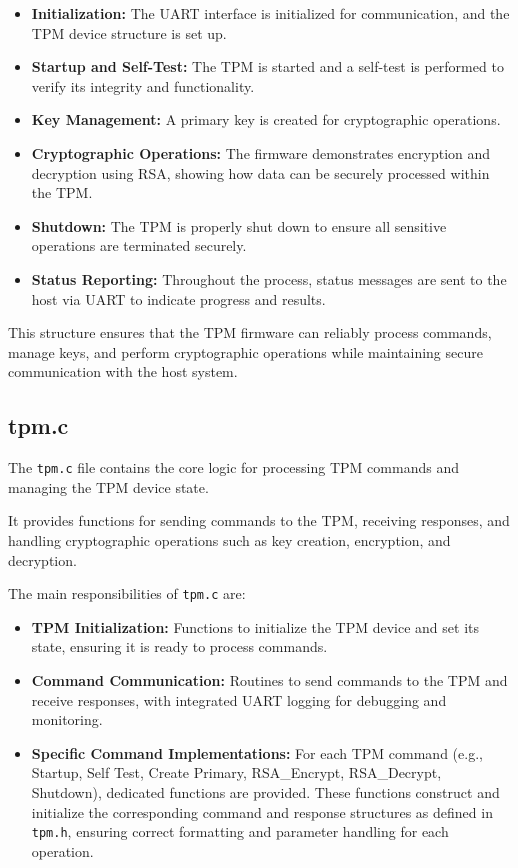 \begin{itemize}
    \item \textbf{Initialization:} The UART interface is 
    initialized for communication, and the TPM device 
    structure is set up.
    \item \textbf{Startup and Self-Test:} The TPM is 
    started and a self-test is performed to verify its 
    integrity and functionality.
    \item \textbf{Key Management:} A primary key is 
    created for cryptographic operations.
    \item \textbf{Cryptographic Operations:} The firmware 
    demonstrates encryption and decryption using RSA, 
    showing how data can be securely processed within 
    the TPM.
    \item \textbf{Shutdown:} The TPM is properly shut 
    down to ensure all sensitive operations are 
    terminated securely.
    \item \textbf{Status Reporting:} Throughout the 
    process, status messages are sent to the host 
    via UART to indicate progress and results.
\end{itemize}

This structure ensures that the TPM firmware can reliably 
process commands, manage keys, and perform cryptographic 
operations while maintaining secure communication with 
the host system.


\subsection{tpm.c}

The \texttt{tpm.c} file contains the core logic for 
processing TPM commands and managing the TPM device state.

It provides functions for sending commands to the TPM, 
receiving responses, and handling cryptographic operations 
such as key creation, encryption, and decryption. 

The main responsibilities of \texttt{tpm.c} are:

\begin{itemize}
    \item \textbf{TPM Initialization:} Functions to 
    initialize the TPM device and set its state,
    ensuring it is ready to process commands.
    \item \textbf{Command Communication:} Routines to 
    send commands to the TPM and receive responses, 
    with integrated UART logging for debugging and 
    monitoring.
    \item \textbf{Specific Command Implementations:} For 
    each TPM command (e.g., Startup, Self Test, Create 
    Primary, RSA\_Encrypt, RSA\_Decrypt, Shutdown),
    dedicated functions are provided. These functions 
    construct and initialize the corresponding command 
    and response structures as defined in \texttt{tpm.h}, 
    ensuring correct formatting and parameter handling 
    for each operation.
\end{itemize}

